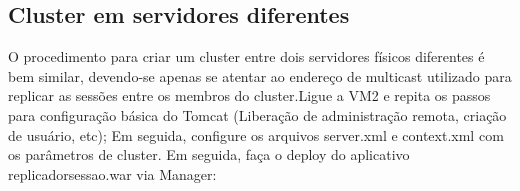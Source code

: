\subsection{Cluster em servidores diferentes}

O procedimento para criar um cluster entre dois servidores físicos diferentes é bem similar, devendo-se apenas se atentar ao endereço de multicast utilizado para replicar as sessões entre os membros do cluster.Ligue a VM2 e repita os passos para configuração básica do Tomcat (Liberação de administração remota, criação de usuário, etc); Em seguida, configure os arquivos server.xml e context.xml com os parâmetros de cluster.
Em seguida, faça o deploy do aplicativo replicadorsessao.war via Manager:
